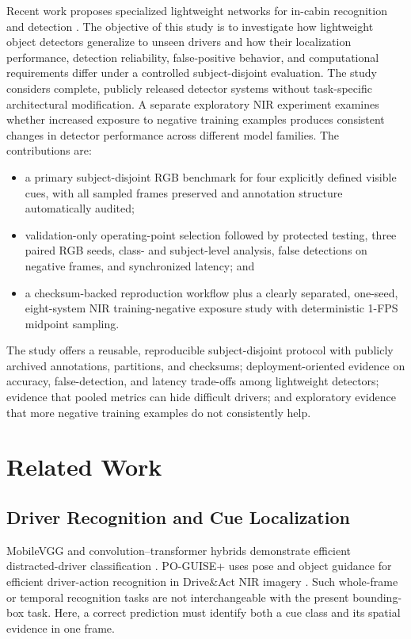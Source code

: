 \documentclass[conference]{IEEEtran}
\newcommand{\rev}[1]{{\color{blue}#1}}
\begin{document}
Recent work proposes specialized lightweight networks for in-cabin recognition and detection \cite{baheti2020mobilevgg,wang2024mfyolo,li2024yolosgc,jin2025yolo11cr}. The objective of this study is to investigate how lightweight object detectors generalize to unseen drivers and how their localization performance, detection reliability, false-positive behavior, and computational requirements differ under a controlled subject-disjoint evaluation. The study considers complete, publicly released detector systems without task-specific architectural modification. A separate exploratory NIR experiment examines whether increased exposure to negative training examples produces consistent changes in detector performance across different model families. The contributions are:
\begin{itemize}
    \item a primary subject-disjoint RGB benchmark for four explicitly defined visible cues, with all sampled frames preserved and annotation structure automatically audited;
    \item validation-only operating-point selection followed by protected testing, three paired RGB seeds, class- and subject-level analysis, false detections on negative frames, and synchronized latency; and
    \item a checksum-backed reproduction workflow plus a clearly separated, one-seed, eight-system NIR training-negative exposure study with deterministic 1-FPS midpoint sampling.
\end{itemize}
\rev{The study offers a reusable, reproducible subject-disjoint protocol with publicly archived annotations, partitions, and checksums; deployment-oriented evidence on accuracy, false-detection, and latency trade-offs among lightweight detectors; evidence that pooled metrics can hide difficult drivers; and exploratory evidence that more negative training examples do not consistently help.}

\section{Related Work}
\subsection{Driver Recognition and Cue Localization}
MobileVGG and convolution--transformer hybrids demonstrate efficient distracted-driver classification \cite{baheti2020mobilevgg,li2024covit}. PO-GUISE+ uses pose and object guidance for efficient driver-action recognition in Drive\&Act NIR imagery \cite{pizarro2024poguise}. Such whole-frame or temporal recognition tasks are not interchangeable with the present bounding-box task. Here, a correct prediction must identify both a cue class and its spatial evidence in one frame.
\end{document}
